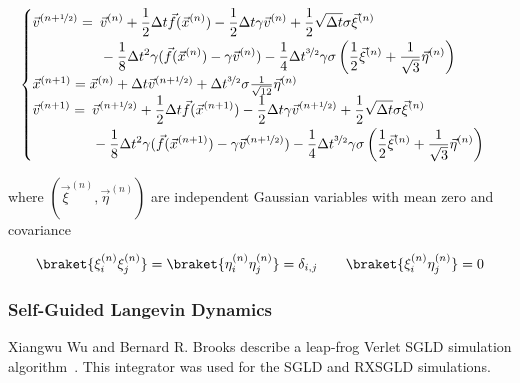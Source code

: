 \documentclass[a4paper]{article}
\begin{document}
\begin{equation}
\begin{cases}
\begin{aligned}[t]\arraycolsep=0pt
\vec{v}^{(n+\nicefrac{1}{2})} = \enspace &  \vec{v}^{(n)} + \frac{1}{2} \Delta t \vec{f}(\vec{x}^{(n)}) - \frac{1}{2} \Delta t \gamma \vec{v}^{(n)} + \frac{1}{2} \sqrt{\Delta t} \sigma \vec{\xi}^{(n)} \\ &
- \frac{1}{8} \Delta t^2 \gamma (\vec{f}(\vec{x}^{(n)}) - \gamma \vec{v}^{(n)}) - \frac{1}{4} \Delta t^{\nicefrac{3}{2}} \gamma \sigma \left(\frac{1}{2} \vec{\xi}^{(n)} + \frac{1}{\sqrt{3}} \vec{\eta}^{(n)}\right)
\end{aligned} \\
\vec{x}^{(n+1)} = \vec{x}^{(n)} + \Delta t \vec{v}^{(n + \nicefrac{1}{2})} + \Delta t^{\nicefrac{3}{2}} \sigma \frac{1}{\sqrt{12}} \vec{\eta}^{(n)} \\
\begin{aligned}[t]\arraycolsep=0pt
\vec{v}^{(n+1)} = \enspace &  \vec{v}^{(n + \nicefrac{1}{2})} + \frac{1}{2} \Delta t \vec{f}(\vec{x}^{(n+1)}) - \frac{1}{2} \Delta t \gamma \vec{v}^{(n + \nicefrac{1}{2})} + \frac{1}{2} \sqrt{\Delta t} \sigma \vec{\xi}^{(n)} \\ &
- \frac{1}{8} \Delta t^2 \gamma (\vec{f}(\vec{x}^{(n+1)}) - \gamma \vec{v}^{(n + \nicefrac{1}{2})}) - \frac{1}{4} \Delta t^{\nicefrac{3}{2}} \gamma \sigma \left(\frac{1}{2} \vec{\xi}^{(n)} + \frac{1}{\sqrt{3}} \vec{\eta}^{(n)}\right)
\end{aligned} 
\end{cases}
\label{eq:final_integrator}
\end{equation}

where $(\vec{\xi}^{(n)}, \vec{\eta}^{(n)})$ are independent Gaussian variables with mean zero and covariance

\begin{equation}
\braket{\xi_i^{(n)} \xi_j^{(n)}} = \braket{\eta_i^{(n)} \eta_j^{(n)}} = \delta_{i,j} \qquad \braket{\xi_i^{(n)} \eta_j^{(n)}} = 0
\end{equation}

\subsubsection{Self-Guided Langevin Dynamics}

Xiangwu Wu and Bernard R. Brooks describe a leap-frog Verlet SGLD simulation algorithm~\cite{XiongwuWu2011a}. This integrator was used for the SGLD and RXSGLD simulations.
\end{document}
